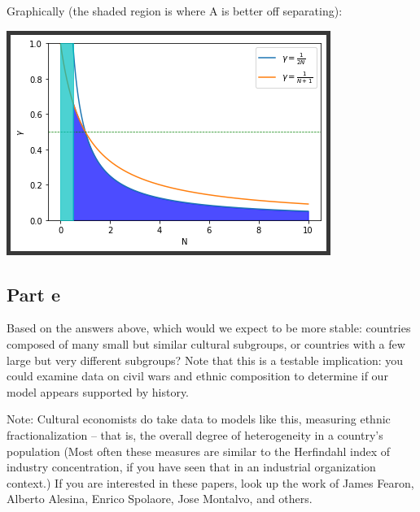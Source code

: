\documentclass[10pt]{article}
\begin{document}
Graphically (the shaded region is where A is better off separating):

\includegraphics{culture_separate}
\newpage

\subsection*{Part e} Based on the answers above, which would we expect to be more stable: countries composed of many small but similar cultural subgroups, or countries with a few large but very different subgroups? Note that this is a testable implication: you could examine data on civil wars and ethnic composition to determine if our model appears supported by history.

Note: Cultural economists do take data to models like this, measuring ethnic fractionalization -- that is, the overall degree of heterogeneity in a country's population (Most often these measures are similar to the Herfindahl index of industry concentration, if you have seen that in an industrial organization context.) If you are interested in these papers, look up the work of James Fearon, Alberto Alesina, Enrico Spolaore, Jose Montalvo, and others. 
\end{document}
